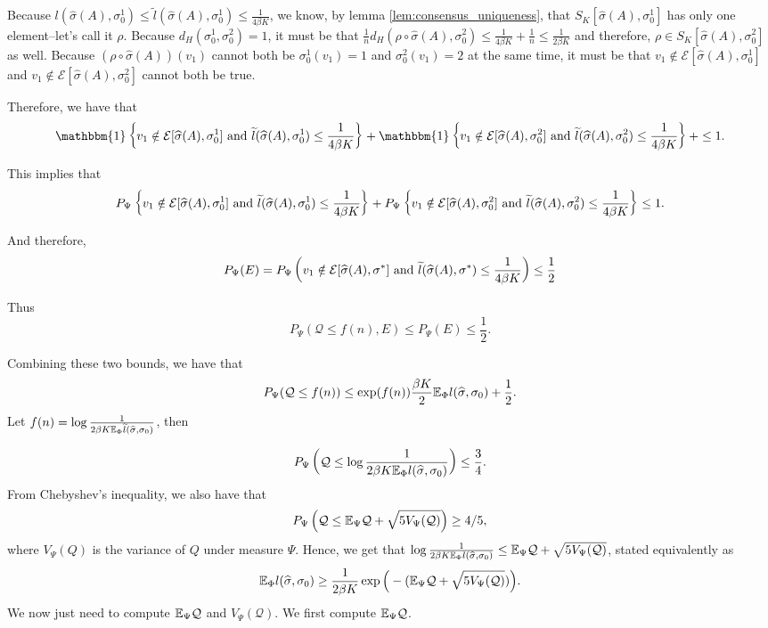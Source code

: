 \documentclass{article}
\begin{document}
Because $l(\hat{\sigma}(A), \sigma_0^1) \leq \tilde{l}(\hat{\sigma}(A), \sigma_0^1) \leq \frac{1}{4 \beta K}$, we know, by lemma \ref{lem:consensus_uniqueness}, that $S_K[\hat{\sigma}(A), \sigma_0^1]$ has only one element--let's call it $\rho$. Because $d_H(\sigma_0^1, \sigma_0^2) = 1$, it must be that $\frac{1}{n} d_H(\rho \circ \hat{\sigma}(A), \sigma_0^2) \leq \frac{1}{4 \beta K} + \frac{1}{n} \leq \frac{1}{2 \beta K}$ and therefore, $\rho \in S_K[\hat{\sigma}(A), \sigma_0^2]$ as well. Because $(\rho \circ \hat{\sigma}(A) )(v_1) $ cannot both be $\sigma_0^1(v_1) = 1$ and $\sigma_0^2(v_1) = 2$ at the same time, it must be that $v_1 \notin \mathcal{E}[\hat{\sigma}(A), \sigma_0^1]$ and $v_1 \notin \mathcal{E}[\hat{\sigma}(A), \sigma_0^2]$ cannot both be true.

Therefore, we have that
\[
\mathbbm{1}\left\{  v_1 \notin \mathcal{E}[\hat{\sigma}(A), \sigma_0^1]  
   \trm{ and }\tilde{l}(\hat{\sigma}(A), \sigma_0^1)  \leq \frac{1}{4\beta K}  \right\} +  
\mathbbm{1}\left\{ v_1 \notin \mathcal{E}[\hat{\sigma}(A), \sigma_0^2] 
   \trm{ and }\tilde{l}(\hat{\sigma}(A), \sigma_0^2)  \leq \frac{1}{4\beta K}  \right\} + 
 \leq 1.
\]

This implies that
\[
P_{\Psi}\left\{  v_1 \notin \mathcal{E}[\widehat{\sigma}(A), \sigma_0^1]  
   \textrm{ and }\widetilde{l}(\widehat{\sigma}(A), \sigma_0^1)  \leq \frac{1}{4\beta K}  \right\} +  
P_{\Psi}\left\{ v_1 \notin \mathcal{E}[\widehat{\sigma}(A), \sigma_0^2] 
   \textrm{ and }\widetilde{l}(\widehat{\sigma}(A), \sigma_0^2)  \leq \frac{1}{4\beta K}  \right\}
 \leq 1.
\]


And therefore, 
\[
P_{\Psi}(E) = P_{\Psi}\left(  v_1 \notin \mathcal{E}[\widehat{\sigma}(A), \sigma^*]   
    \textrm{ and }  \widetilde{l}(\widehat{\sigma}(A), \sigma^*) \leq \frac{1}{4\beta K} \right) \leq \frac{1}{2}
\]

Thus
\[
P_{\Psi}(\mathcal{Q} \leq f(n), E) 
             \leq P_{\Psi}(E) \leq \frac{1}{2}.
\]




Combining these two bounds, we have that
\[
P_{\Psi}(\mathcal{Q} \leq f(n)) \leq \exp(f(n)) \frac{\beta K}{2} {\mathbb E}_{\Phi} l(\widehat{\sigma}, \sigma_0) + \frac{1}{2}.
\]
Let $f(n) = \log \frac{1}{2 \beta K  {\mathbb E}_{\Phi} \widetilde{l}(\widehat{\sigma}, \sigma_0)}$, then 

\[
P_{\Psi}\left(\mathcal{Q} \leq \log \frac{1}{2 \beta K {\mathbb E}_{\Phi} l(\widehat{\sigma}, \sigma_0)} \right) \leq \frac{3}{4}.
\]
From Chebyshev's inequality, we also have that
\[
P_{\Psi}\left( \mathcal{Q} \leq {\mathbb E}_{\Psi} \mathcal{Q} + \sqrt{ 5 V_{\Psi}(\mathcal{Q})} \right) \geq 4/5,
\]
where $V_\Psi(Q)$ is the variance of $Q$ under measure $\Psi$. Hence, we get that $\log \frac{1}{2 \beta K {\mathbb E}_{\Phi} l(\widehat{\sigma},\sigma_0)} \leq {\mathbb E}_{\Psi} \mathcal{Q} + \sqrt{ 5 V_{\Psi}(\mathcal{Q})}$, stated equivalently as
\[
{\mathbb E}_{\Phi} l(\widehat{\sigma}, \sigma_0) \geq \frac{1}{2 \beta K} \exp\Big( - ({\mathbb E}_{\Psi} \mathcal{Q} + \sqrt{ 5 V_{\Psi}(\mathcal{Q})} ) \Big).
\]
We now just need to compute ${\mathbb E}_{\Psi} \mathcal{Q}$ and $V_{\Psi}(\mathcal{Q})$. We first compute ${\mathbb E}_{\Psi} \mathcal{Q}$.
\end{document}
